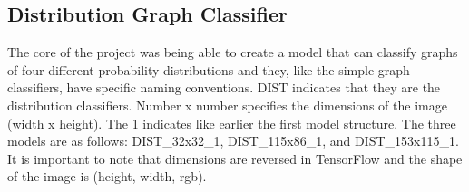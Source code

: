 \documentclass[12pt]{article}
\begin{document}
            \begin{table}[htp]

                \begin{center} 


                \caption{Model Information for classifying generated from scraped graphs}
                \label{cifar-gen-scp-1}

                \end{center}

            \end{table}

         
        \subsection{Distribution Graph Classifier}

            The core of the project was being able to create a model that can classify graphs of four different probability distributions 
            and they, like the simple graph classifiers, have specific naming conventions. 
            DIST indicates that they are the distribution classifiers. Number x number specifies the dimensions of the image (width x height). 
            The 1 indicates like earlier the first model structure. The three models are as follows: 
            DIST\_32x32\_1, DIST\_115x86\_1, and DIST\_153x115\_1. It is important to note that dimensions are reversed in TensorFlow 
            and the shape of the image is (height, width, rgb).
            
\end{document}
